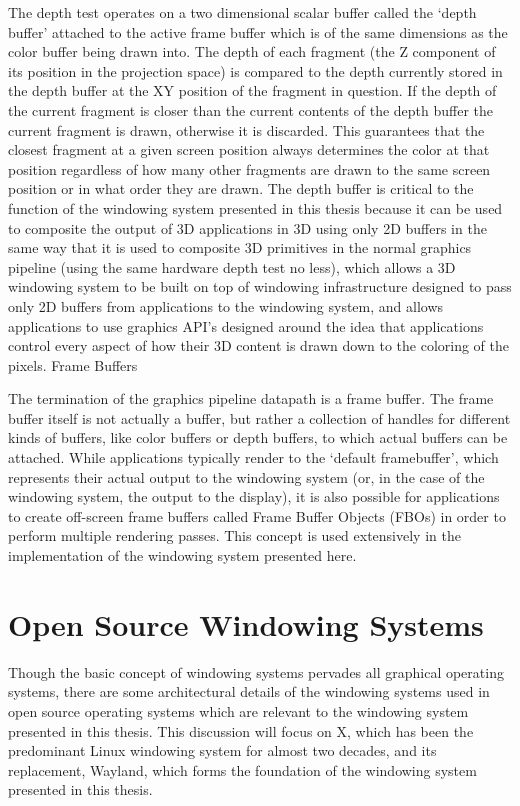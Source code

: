 The depth test operates on a two dimensional scalar buffer called the ‘depth buffer’ attached to the active frame buffer which is of the same dimensions as the color buffer being drawn into. The depth of each fragment (the Z component of its position in the projection space) is compared to the depth currently stored in the depth buffer at the XY position of the fragment in question. If the depth of the current fragment is closer than the current contents of the depth buffer the current fragment is drawn, otherwise it is discarded. This guarantees that the closest fragment at a given screen position always determines the color at that position regardless of how many other fragments are drawn to the same screen position or in what order they are drawn. 
The depth buffer is critical to the function of the windowing system presented in this thesis because it can be used to composite the output of 3D applications in 3D using only 2D buffers in the same way that it is used to composite 3D primitives in the normal graphics pipeline (using the same hardware depth test no less), which allows a 3D windowing system to be built on top of windowing infrastructure designed to pass only 2D buffers from applications to the windowing system, and allows applications to use graphics API’s designed around the idea that applications control every aspect of how their 3D content is drawn down to the coloring of the pixels.
Frame Buffers

The termination of the graphics pipeline datapath is a frame buffer. The frame buffer itself is not actually a buffer, but rather a collection of handles for different kinds of buffers, like color buffers or depth buffers, to which actual buffers can be attached. While applications typically render to the ‘default framebuffer’, which represents their actual output to the windowing system (or, in the case of the windowing system, the output to the display), it is also possible for applications to create off-screen frame buffers called Frame Buffer Objects (FBOs) in order to perform multiple rendering passes. This concept is used extensively in the implementation of the windowing system presented here. 
	
\section{Open Source Windowing Systems}

Though the basic concept of windowing systems pervades all graphical operating systems, there are some architectural details of the windowing systems used in open source operating systems which are relevant to the windowing system presented in this thesis. This discussion will focus on X, which has been the predominant Linux windowing system for almost two decades, and its replacement, Wayland, which forms the foundation of the windowing system presented in this thesis.

